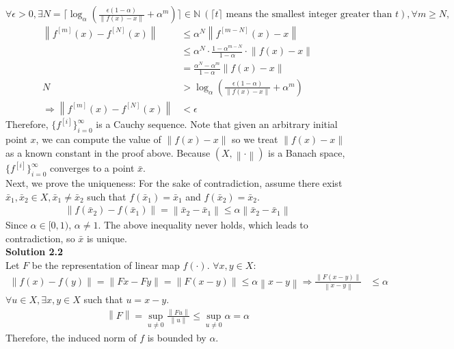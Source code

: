 \documentclass[a4paper,10.5pt]{article}
\newcommand{\N}{\mathbb{N}}
\newcommand{\norm}[1]{\left\lVert#1\right\rVert}
\begin{document}
\clearpage

$\forall \epsilon>0,\exists N = \bigg\lceil \log_\alpha\left(\frac{\epsilon(1-\alpha)}{\norm{f(x)-x}}+\alpha^m\right) \bigg\rceil \in \N \ (\lceil t \rceil \text{ means the smallest integer greater than } t),\forall m \geq N,$
\begin{align*}
\norm{f^{[m]}(x)-f^{[N]}(x)} 
&\leq \alpha^N \norm{f^{[m-N]}(x)-x} \\
&\leq \alpha^N \cdot \frac{1-\alpha^{m-N}}{1-\alpha} \cdot \norm{f(x)-x} \\
&= \frac{\alpha^N-\alpha^{m}}{1-\alpha} \norm{f(x)-x} \\
N&>\log_\alpha\left(\frac{\epsilon(1-\alpha)}{\norm{f(x)-x}}+\alpha^m\right) \\
\Rightarrow \norm{f^{[m]}(x)-f^{[N]}(x)} &< \epsilon
\end{align*}
Therefore, $\{f^{[i]}\}_{i=0}^{\infty}$ is a Cauchy sequence.
Note that given an arbitrary initial point $x$, we can compute the value of $\|f(x)-x\|$ so we treat $\|f(x)-x\|$ as a known constant in the proof above. Because $\left(X, \left\lVert\cdot\right\rVert\right)$ is a Banach space, $\{f^{[i]}\}_{i=0}^{\infty}$ converges to a point $\bar{x}$. \\

Next, we prove the uniqueness: For the sake of contradiction, assume there exist $\bar{x}_1,\bar{x}_2 \in X, \bar{x}_1 \neq \bar{x}_2$ such that $f(\bar{x}_1)=\bar{x}_1$ and $f(\bar{x}_2)=\bar{x}_2$.
\begin{align*}
	\norm{f(\bar{x}_2)-f(\bar{x}_1)} =\norm{\bar{x}_2-\bar{x}_1} \leq \alpha\norm{\bar{x}_2-\bar{x}_1}	
\end{align*}
Since $\alpha \in [0,1)$, $\alpha \neq 1$. The above inequality never holds, which leads to contradiction, so $\bar{x}$ is unique. \\

\noindent \textbf {Solution 2.2} \\
Let $F$ be the representation of linear map $f(\cdot)$. $\forall x,y \in X$:
\begin{align*}
\norm{f(x)-f(y)} = \norm{Fx-Fy} = \norm{F(x-y)} \leq \alpha \norm{x-y} \Rightarrow \frac{\norm{F(x-y)}}{\norm{x-y}} &\leq \alpha
\end{align*}
$\forall u \in X, \exists x,y \in X$ such that $u = x-y$.
\begin{align*}
\norm{F} = \sup_{u\neq 0}\frac{\norm{Fu}}{\norm{u}} \leq \sup_{u\neq 0} \alpha = \alpha
\end{align*}
Therefore, the induced norm of $f$ is bounded by $\alpha$.
\end{document}
